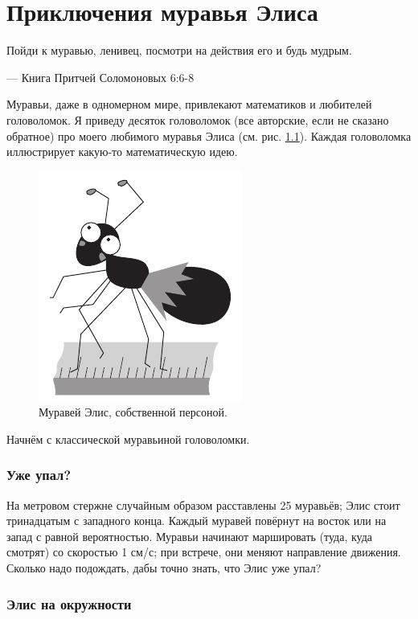 \chapter{Приключения муравья Элиса}


\setlength{\epigraphwidth}{.67\textwidth}
\epigraph{Пойди к муравью, ленивец, посмотри на действия его и будь мудрым.
}{--- Книга Притчей Соломоновых 6:6-8} 

Муравьи, даже в одномерном мире, привлекают математиков и любителей головоломок.
Я приведу десяток головоломок (все авторские, если не сказано обратное) про моего любимого муравья Элиса
(см. рис. \ref{pic:alice1}).
Каждая головоломка иллюстрирует какую-то математическую идею.

\begin{figure}[ht!]
\centering
\includegraphics[scale=.7]{pics/alice1}
\caption{Муравей Элис, собственной персоной.}
\label{pic:alice1}
\end{figure}

Начнём с классической муравьиной головоломки.

\subsection*{Уже упал?}\label{Уже упал?}

На метровом стержне случайным образом расставлены 25 муравьёв; Элис стоит тринадцатым с западного конца.
Каждый муравей повёрнут на восток или на запад с равной вероятностью.
Муравьи начинают маршировать (туда, куда смотрят) со скоростью 1 см/с;
при встрече, они меняют направление движения.
Сколько надо подождать, дабы точно знать, что Элис уже упал?

\subsection*{Элис на окружности}\label{Элис на окружности}

